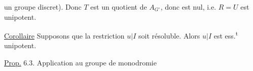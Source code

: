 un groupe discret). Donc $T$ est un quotient de $A_{G^\circ}$, donc est nul, i.e. $R=U$ est unipotent.

\uline{Corollaire}  Supposons que la restriction $u|I$ soit  résoluble. Alors  $u|I$ est ess.\textsuperscript{t} unipotent.

\uline{Prop.} 6.3. Application au groupe de monodromie 
